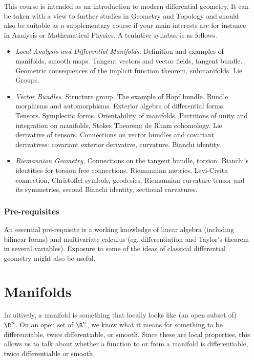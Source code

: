\documentclass[a4paper]{article}
\begin{document}
\maketitle
{\small
\setlength{\parindent}{0em}
\setlength{\parskip}{1em}
This course is intended as an introduction to modern differential geometry. It can be taken with a view to further studies in Geometry and Topology and should also be suitable as a supplementary course if your main interests are for instance in Analysis or Mathematical Physics. A tentative syllabus is as follows.

\begin{itemize}[label={$\bullet$}]
  \item \emph{Local Analysis and Differential Manifolds.} Definition and examples of manifolds, smooth maps. Tangent vectors and vector fields, tangent bundle. Geometric consequences of the implicit function theorem, submanifolds. Lie Groups.

  \item \emph{Vector Bundles.} Structure group. The example of Hopf bundle. Bundle morphisms and automorphisms. Exterior algebra of differential forms. Tensors. Symplectic forms. Orientability of manifolds. Partitions of unity and integration on manifolds, Stokes Theorem; de Rham cohomology. Lie derivative of tensors. Connections on vector bundles and covariant derivatives: covariant exterior derivative, curvature. Bianchi identity.

  \item \emph{Riemannian Geometry.} Connections on the tangent bundle, torsion. Bianchi's identities for torsion free connections. Riemannian metrics, Levi-Civita connection, Christoffel symbols, geodesics. Riemannian curvature tensor and its symmetries, second Bianchi identity, sectional curvatures.
\end{itemize}

\subsubsection*{Pre-requisites}
An essential pre-requisite is a working knowledge of linear algebra (including bilinear forms) and multivariate calculus (eg. differentiation and Taylor's theorem in several variables). Exposure to some of the ideas of classical differential geometry might also be useful.
}
\tableofcontents

\section{Manifolds}
Intuitively, a manifold is something that locally looks like (an open subset of) $\R^n$. On an open set of $\R^n$, we know what it means for something to be differentiable, twice differentiable, or smooth. Since these are local properties, this allows us to talk about whether a function to or from a manifold is differentiable, twice differentiable or smooth.
\end{document}
